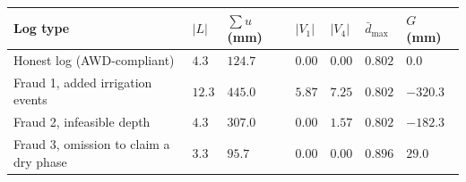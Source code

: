 
\begin{tabular}{@{}p{2.2cm}p{0.7cm}p{1.05cm}p{0.8cm}p{0.8cm}p{1.0cm}p{0.95cm}@{}}
\toprule
Log type & $|L|$ & $\sum u$ (mm) & $|V_1|$ & $|V_4|$ & $\bar d_{\max}$ & $G$ (mm) \\
\midrule
Honest log (AWD-compliant) & $4.3$ & $124.7$ & $0.00$ & $0.00$ & $0.802$ & $0.0$ \\
Fraud 1, added irrigation events & $12.3$ & $445.0$ & $5.87$ & $7.25$ & $0.802$ & $-320.3$ \\
Fraud 2, infeasible depth & $4.3$ & $307.0$ & $0.00$ & $1.57$ & $0.802$ & $-182.3$ \\
Fraud 3, omission to claim a dry phase & $3.3$ & $95.7$ & $0.00$ & $0.00$ & $0.896$ & $29.0$ \\
\bottomrule
\end{tabular}
